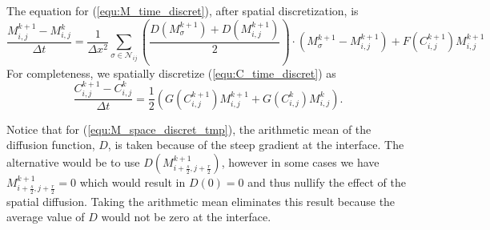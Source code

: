 The equation for (\ref{equ:M_time_discret}), after spatial discretization, is
\begin{equation} \label{equ:M_space_discret_tmp}
  \frac{M^{k+1}_{i,j} - M^{k}_{i,j}}{\Delta t} =
    \frac{1}{\Delta x^2} \sum_{\sigma \in \mathcal{N}_{ij}}
    \left( \frac{D(M^{k+1}_{\sigma}) + D(M^{k+1}_{i,j})}{2} \right)
    \cdot \left( M^{k+1}_{\sigma} - M^{k+1}_{i,j} \right)
    + F(C^{k+1}_{i,j}) M^{k+1}_{i,j}
\end{equation}
For completeness, we spatially discretize (\ref{equ:C_time_discret}) as
\begin{equation} \label{equ:C_space_discret_tmp}
  \frac{C^{k+1}_{i,j} - C^{k}_{i,j}}{\Delta t} = \frac{1}{2} ( G(C^{k+1}_{i,j}) M^{k+1}_{i,j} + G(C^{k}_{i,j}) M^{k}_{i,j} ).
\end{equation}

Notice that for (\ref{equ:M_space_discret_tmp}), the arithmetic mean of the diffusion function, $D$, is taken because of the steep gradient at the interface.
The alternative would be to use $D(M^{k+1}_{i+\frac{s}{2}, j +\frac{r}{2}})$, however in some cases we have $M^{k+1}_{i+\frac{s}{2}, j +\frac{r}{2}} = 0$ which would result in $D(0) = 0$ and thus nullify the effect of the spatial diffusion.
Taking the arithmetic mean eliminates this result because the average value of $D$ would not be zero at the interface.


